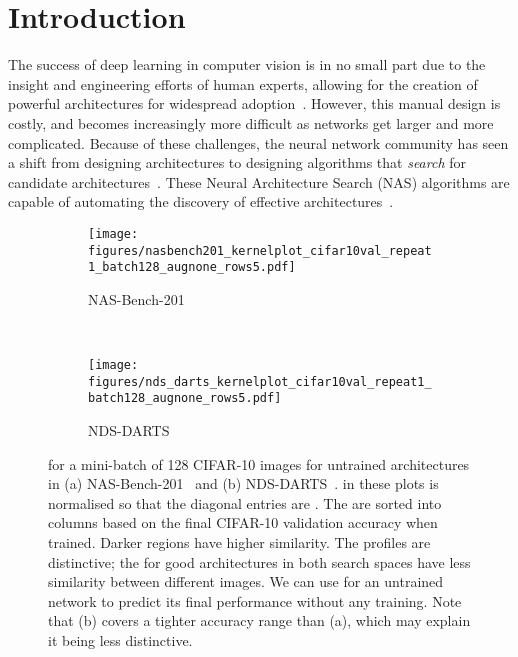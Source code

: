 \documentclass{article}
\newcommand{\maybebf}[0]{}
\begin{document}
\section{Introduction}
The success of deep learning in computer vision is in no small part due to the insight and engineering efforts of human experts, allowing for the creation of powerful architectures for widespread adoption~\citep{krizhevsky2012imagnet,simonyan2015very,he2016deep,szegedy2016rethinking,huang2017densely}. However, this manual design is costly, and becomes increasingly more difficult as networks get larger and more complicated. Because of these challenges, the neural network community has seen a shift from designing architectures to designing algorithms that {\it search} for candidate architectures~\citep{elsken2019neural,wistuba2019survey}. These Neural Architecture Search (NAS) algorithms are capable of automating the discovery of effective architectures~\citep{zoph2017neural,zoph2018learning,pham2018efficient,tan2019mnasnet,liu2019darts,real2019regularized}.

\begin{figure*}[!h]

\centering
    \begin{subfigure}{.49\textwidth}
    \texttt{[image: figures/nasbench201\_kernelplot\_cifar10val\_repeat1\_batch128\_augnone\_rows5.pdf]}
    \caption{NAS-Bench-201}
    \label{fig:activationhamming201}
    \end{subfigure}~
    \begin{subfigure}{.49\textwidth}
    \texttt{[image: figures/nds\_darts\_kernelplot\_cifar10val\_repeat1\_batch128\_augnone\_rows5.pdf]}
    \caption{NDS-DARTS}
    \label{fig:activationhammingdarts}
    \end{subfigure}


\caption{{\color{black}  for a mini-batch of 128 CIFAR-10 images for {\maybebf untrained} architectures in (a) NAS-Bench-201~\citep{Dong2020NAS-Bench-201} and (b) NDS-DARTS~\citep{radosavovic2019network}.  in these plots is normalised so that the diagonal entries are . The  are sorted into columns based on the final CIFAR-10 validation accuracy {\maybebf when trained}. Darker regions have higher similarity. The profiles are distinctive; the  for good architectures in both search spaces have less similarity between different images. We can use  for an untrained network to predict its final performance without any training. Note that (b) covers a tighter accuracy range than (a), which may explain it being less distinctive.}}
    \label{fig:normhamming} 
\end{figure*}
\end{document}
